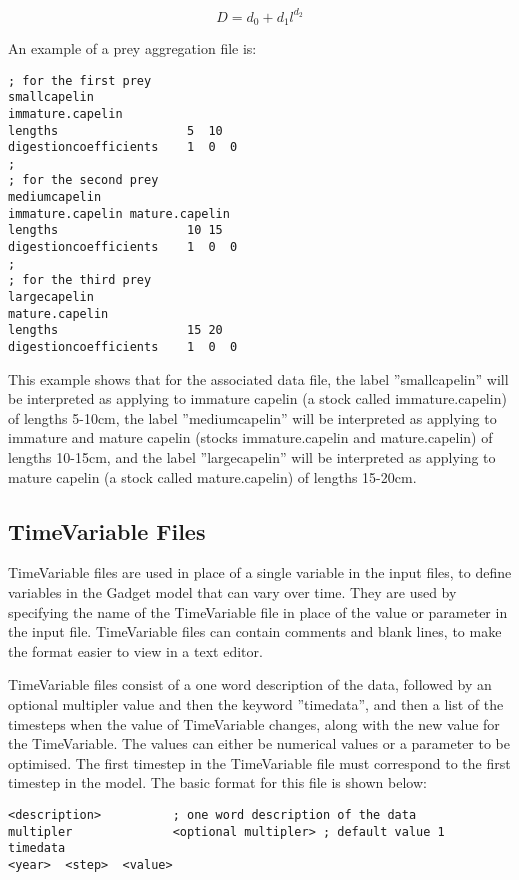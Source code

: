 \documentclass[10pt,twoside]{book}
\begin{document}
\begin{equation}\label{eq:digestion}
D = d_{0} + d_{1}l^{d_{2}}
\end{equation}

\bigskip
An example of a prey aggregation file is:

{\small\begin{verbatim}
; for the first prey
smallcapelin
immature.capelin
lengths                  5  10
digestioncoefficients    1  0  0
;
; for the second prey
mediumcapelin
immature.capelin mature.capelin
lengths                  10 15
digestioncoefficients    1  0  0
;
; for the third prey
largecapelin
mature.capelin
lengths                  15 20
digestioncoefficients    1  0  0
\end{verbatim}}

This example shows that for the associated data file, the label ''smallcapelin'' will be interpreted as applying to immature capelin (a stock called immature.capelin) of lengths 5-10cm, the label ''mediumcapelin'' will be interpreted as applying to immature and mature capelin (stocks immature.capelin and mature.capelin) of lengths 10-15cm, and the label ''largecapelin'' will be interpreted as applying to mature capelin (a stock called mature.capelin) of lengths 15-20cm.

\subsection{TimeVariable Files}\label{subsec:timevar}
TimeVariable files are used in place of a single variable in the input files, to define variables in the Gadget model that can vary over time.  They are used by specifying the name of the TimeVariable file in place of the value or parameter in the input file.  TimeVariable files can contain comments and blank lines, to make the format easier to view in a text editor.

\bigskip
TimeVariable files consist of a one word description of the data, followed by an optional multipler value and then the keyword ''timedata'', and then a list of the timesteps when the value of TimeVariable changes, along with the new value for the TimeVariable.  The values can either be numerical values or a parameter to be optimised.  The first timestep in the TimeVariable file must correspond to the first timestep in the model.  The basic format for this file is shown below:

{\small\begin{verbatim}
<description>          ; one word description of the data
multipler              <optional multipler> ; default value 1
timedata
<year>  <step>  <value>
\end{verbatim}}
\end{document}
